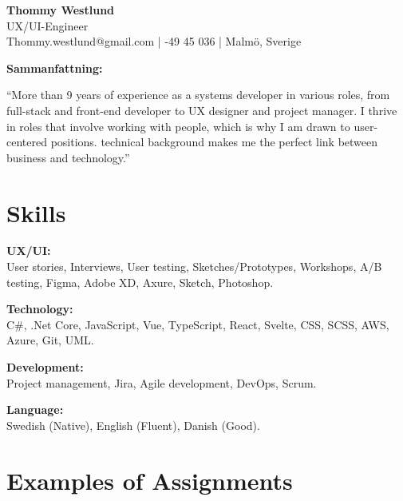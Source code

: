 \documentclass[a4paper,10pt]{article}
\begin{document}
\begin{center}
    \huge \textbf{Thommy Westlund}\\
    \vspace{0.2cm}
    \Large UX/UI-Engineer\\
    \vspace{0.3cm}
    \normalsize Thommy.westlund@gmail.com \quad | -49 45 036 \quad | \quad Malmö, Sverige
\end{center}

\vspace{0.5cm}

\noindent \textbf{Sammanfattning:}
\vspace{0.2cm}

\noindent
“More than 9 years of experience as a systems developer in various roles, from full-stack and front-end developer to UX designer and project manager. I thrive in roles that involve working with people, which is why I am drawn to user-centered positions. technical background makes me the perfect link between business and technology.”
\vspace{0.3cm}

\section*{Skills}

\textbf{UX/UI:}\\
User stories, Interviews, User testing, Sketches/Prototypes, Workshops, A/B testing, Figma, Adobe XD, Axure, Sketch, Photoshop.

\vspace{0.3cm}

\textbf{Technology:}\\
C\#, .Net Core, JavaScript, Vue, TypeScript, React, Svelte, CSS, SCSS, AWS, Azure, Git, UML.

\vspace{0.3cm}

\textbf{Development:}\\
Project management, Jira, Agile development, DevOps, Scrum.

\vspace{0.3cm}

\textbf{Language:}\\
Swedish (Native), English (Fluent), Danish (Good).

\vspace{0.5cm}

\section*{Examples of Assignments}
\end{document}

